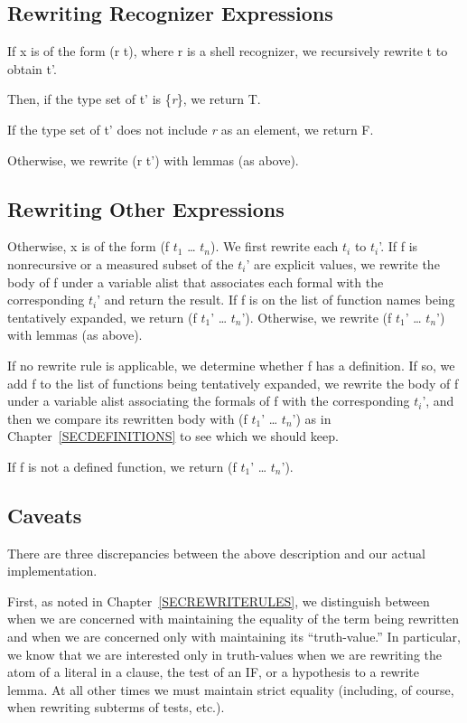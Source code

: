 \documentclass[11pt]{book}
\newcommand{\pubinlineunderline}[1]{\emph{#1}}
\newcommand{\pubdefaulttextsize}{\large}
\begin{document}
\subsection{Rewriting Recognizer Expressions}
\pubdefaulttextsize
If x is of the form (r t), where r is a shell recognizer, we
recursively rewrite t to obtain t'.

Then, if the type set of t' is \{\pubinlineunderline{r}\}, we return T.

If the type set of t' does not include \pubinlineunderline{r} as an element, we return F.

Otherwise, we rewrite (r t') with lemmas (as above).
\subsection{Rewriting Other Expressions}
\pubdefaulttextsize
Otherwise, x is of the form (f $t_{1}$ \ldots{} $t_{n}$).  We first rewrite each
$t_{i}$ to $t_{i}$'.
If f is nonrecursive
or a measured subset of the $t_{i}$' are explicit values, we 
rewrite the body of f under
a variable alist that associates each formal with the corresponding
$t_{i}$' and return the result.  If f is on the list of function
names  being tentatively expanded, we return (f $t_{1}$' \ldots{} $t_{n}$').
Otherwise, we rewrite (f $t_{1}$' \ldots{} $t_{n}$') with lemmas
(as above).

If no rewrite rule is applicable,  we determine whether f has a definition.
If so, we
add f to the list of functions being tentatively expanded,
we rewrite the body of f under a variable alist
associating the formals of f with the corresponding
$t_{i}$', and then we compare its rewritten body with
(f $t_{1}$' \ldots{} $t_{n}$') as in Chapter~\ref{SECDEFINITIONS}
to see which 
we should keep.

If f is not a defined function, we return (f $t_{1}$' \ldots{} $t_{n}$').
\subsection{Caveats}
\pubdefaulttextsize
There are three discrepancies between the above
description and our actual implementation.

First, as noted in Chapter~\ref{SECREWRITERULES}, we distinguish between when
we are concerned with  maintaining the equality of the term being rewritten
and when we are   concerned only with
maintaining its ``truth-value.''  In particular, we know that we are  interested only
in truth-values when we
are rewriting the atom of a literal in a clause, the test of an IF, or
a hypothesis to a rewrite lemma.  At all other times we must maintain
strict equality (including, of course, when rewriting subterms of
tests, etc.).
\end{document}
